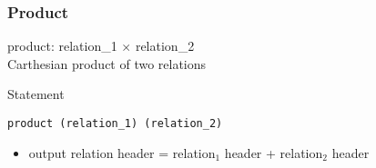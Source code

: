 \documentclass[dvipsnames]{beamer}
\theoremstyle{plain}
\begin{document}
\begin{frame}[fragile]
  \frametitle{Product}

  \begin{definition}
    \alert{product}: relation\_1 $\times$ relation\_2\\
      Carthesian product of two relations
  \end{definition}

  \pause
  \begin{block}{Statement}
    \begin{lstlisting}
product (relation_1) (relation_2)
    \end{lstlisting}
  \end{block}

  \pause
  \begin{itemize}
    \item output relation header = relation$_1$ header + relation$_2$ header
  \end{itemize}
\end{frame}
\end{document}
